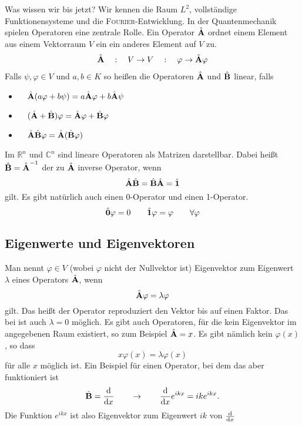 \documentclass[a4paper,12pt,portrait]{book}
\numberwithin{equation}{section}
\begin{document}
Was wissen wir bis jetzt? Wir kennen die Raum $L^2$, vollständige Funktionensysteme und die \textsc{Fourier}-Entwicklung. 
In der Quantenmechanik spielen Operatoren eine zentrale Rolle. Ein Operator $\hat{\textbf{A}}$ ordnet einem Element aus einem Vektorraum $V$ ein ein anderes Element auf $V$ zu.
\begin{align*}
\hat{\textbf{A}}\quad:\quad V\rightarrow V \quad : \quad \varphi \rightarrow \hat{\textbf{A}}\varphi
\end{align*}
Falls $\psi, \varphi\in V$ und $a,b\in K$ so heißen die Operatoren $\hat{\textbf{A}}$ und $\hat{\textbf{B}}$ linear, falls
\begin{itemize}
	\item $\quad\hat{\textbf{A}}(a\varphi+b\psi)=a\hat{\textbf{A}}\varphi + b\hat{\textbf{A}}\psi$
	\item $\quad (\hat{\textbf{A}}+\hat{\textbf{B}})\varphi = \hat{\textbf{A}}\varphi + \hat{\textbf{B}}\varphi$
	\item $\quad \hat{\textbf{A}}\hat{\textbf{B}}\varphi = \hat{\textbf{A}}(\hat{\textbf{B}}\varphi)$
\end{itemize}
Im $\mathbb{R}^n$ und $\mathbb{C}^n$ sind lineare Operatoren als Matrizen darstellbar. Dabei heißt $\hat{\textbf{B}}=\hat{\textbf{A}}^{-1}$ der zu  $\hat{\textbf{A}}$ inverse Operator, wenn
\begin{equation*}
\hat{\textbf{A}}\hat{\textbf{B}}=\hat{\textbf{B}}\hat{\textbf{A}}=\hat{\textbf{1}}
\end{equation*}
gilt. Es gibt natürlich auch einen 0-Operator und einen 1-Operator.
\begin{equation*}
\hat{\textbf{0}}\varphi=0\qquad \hat{\textbf{1}}\varphi=\varphi\qquad \forall \varphi
\end{equation*}

\subsection{Eigenwerte und Eigenvektoren}
Man nennt $\varphi\in V$ (wobei $\varphi$ nicht der Nullvektor ist) Eigenvektor zum Eigenwert $\lambda$ eines Operators $\hat{\textbf{A}}$, wenn
\begin{equation*}
\hat{\textbf{A}}\varphi = \lambda \varphi
\end{equation*}
gilt. Das heißt der Operator reproduziert den Vektor bis auf einen Faktor. Das bei ist auch $\lambda = 0$ möglich. Es gibt auch Operatoren, für die kein Eigenvektor im angegebenen Raum existiert, so zum Beispiel $\hat{\textbf{A}} =  x$. Es gibt nämlich kein $\varphi(x)$, so dass
\begin{equation*}
x\varphi (x) = \lambda \varphi(x)
\end{equation*}
für alle $x$ möglich ist. Ein Beispiel für einen Operator, bei dem das aber funktioniert ist 
\begin{equation*}
\hat{\textbf{B}}=\frac{\mathrm{d}{}}{\mathrm{d}{x}} \qquad \rightarrow \qquad \frac{\mathrm{d}{}}{\mathrm{d}{x}}e^{ikx}=ike^{ikx}.
\end{equation*}
Die Funktion $e^{ikx}$ ist also Eigenvektor zum Eigenwert $ik$ von $\frac{\mathrm{d}{}}{\mathrm{d}{x}}$
\end{document}
